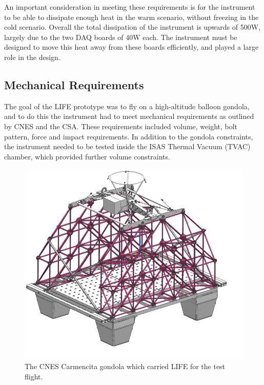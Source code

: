 An important consideration in meeting these requirements is for the instrument to be able to dissipate enough heat in the warm scenario, without freezing in the cold scenario. Overall the total dissipation of the instrument is upwards of 500W, largely due to the two DAQ boards of 40W each. The instrument must be designed to move this heat away from these boards efficiently, and played a large role in the design.

\subsection{Mechanical Requirements}
The goal of the LIFE prototype was to fly on a high-altitude balloon gondola, and to do this the instrument had to meet mechanical requirements as outlined by CNES and the CSA. These requirements included volume, weight, bolt pattern, force and impact requirements. In addition to the gondola constraints, the instrument needed to be tested inside the ISAS Thermal Vacuum (TVAC) chamber, which provided further volume constraints.

\begin{figure}[h]
\centering
  \includegraphics[width=0.7\linewidth]{chap3_images/Carmencita_empty.png}
  \caption{The CNES Carmencita gondola which carried LIFE for the test flight.}
  \label{fig:Carmencita_empty}
\end{figure}

